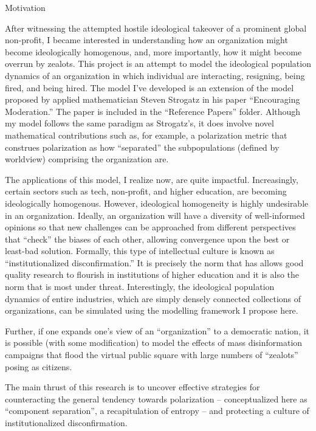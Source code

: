 \documentclass[]{article}
\date{}
\begin{document}
Motivation

After witnessing the attempted hostile ideological takeover of a
prominent global non-profit, I became interested in understanding how an
organization might become ideologically homogenous, and, more
importantly, how it might become overrun by zealots. This project is an
attempt to model the ideological population dynamics of an organization
in which individual are interacting, resigning, being fired, and being
hired. The model I've developed is an extension of the model proposed by
applied mathematician Steven Strogatz in his paper ``Encouraging
Moderation.'' The paper is included in the ``Reference Papers'' folder.
Although my model follows the same paradigm as Strogatz's, it does
involve novel mathematical contributions such as, for example, a
polarization metric that construes polarization as how ``separated'' the
subpopulations (defined by worldview) comprising the organization are.

The applications of this model, I realize now, are quite impactful.
Increasingly, certain sectors such as tech, non-profit, and higher
education, are becoming ideologically homogenous. However, ideological
homogeneity is highly undesirable in an organization. Ideally, an
organization will have a diversity of well-informed opinions so that new
challenges can be approached from different perspectives that ``check''
the biases of each other, allowing convergence upon the best or
least-bad solution. Formally, this type of intellectual culture is known
as ``institutionalized disconfirmation.'' It is precisely the norm that
has allows good quality research to flourish in institutions of higher
education and it is also the norm that is most under threat.
Interestingly, the ideological population dynamics of entire industries,
which are simply densely connected collections of organizations, can be
simulated using the modelling framework I propose here.

Further, if one expands one's view of an ``organization'' to a
democratic nation, it is possible (with some modification) to model the
effects of mass disinformation campaigns that flood the virtual public
square with large numbers of ``zealots'' posing as citizens.

The main thrust of this research is to uncover effective strategies for
counteracting the general tendency towards polarization --
conceptualized here as ``component separation'', a recapitulation of
entropy -- and protecting a culture of institutionalized
disconfirmation.
\end{document}
